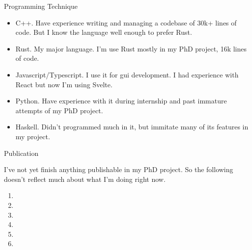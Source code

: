 \documentclass{resume} %
\begin{document}
\begin{rSection}{Programming Technique}
\begin{itemize}
	\item C++. Have experience writing and managing a codebase of 30k+ lines of code. But I know the language well enough to prefer Rust.
	\item Rust. My major language. I'm use Rust mostly in my PhD project, 16k lines of code.
	\item Javascript/Typescript. I use it for gui development. I had experience with React but now I'm using Svelte.
	\item Python. Have experience with it during internship and past immature attempts of my PhD project.
	\item Haskell. Didn't programmed much in it, but immitate many of its features in my project.
\end{itemize}
\end{rSection}

\begin{rSection}{Publication}

I've not yet finish anything publishable in my PhD project. So the following doesn't reflect much about what I'm doing right now.

\begin{enumerate}
	\item {}
	\item {}
	\item {}
	\item {}
	\item {}
	\item {}
\end{enumerate}
\end{rSection}
\end{document}
